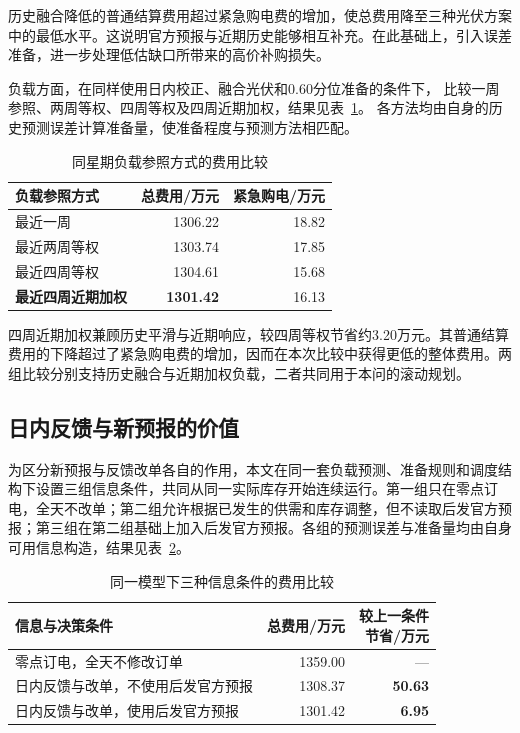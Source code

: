 历史融合降低的普通结算费用超过紧急购电费的增加，使总费用降至三种光伏方案中的最低水平。这说明官方预报与近期历史能够相互补充。在此基础上，引入误差准备，进一步处理低估缺口所带来的高价补购损失。

负载方面，在同样使用日内校正、融合光伏和0.60分位准备的条件下，
比较一周参照、两周等权、四周等权及四周近期加权，结果见表~\ref{tab:q3_load_compare}。
各方法均由自身的历史预测误差计算准备量，使准备程度与预测方法相匹配。

\begin{table}[!htbp]
\centering
\caption{同星期负载参照方式的费用比较}
\label{tab:q3_load_compare}
\begin{tabular}{lrr}
\toprule
负载参照方式 & 总费用/万元 & 紧急购电/万元\\
\midrule
最近一周 &1306.22&18.82\\
最近两周等权 &1303.74&17.85\\
最近四周等权 &1304.61&15.68\\
\textbf{最近四周近期加权} &\textbf{1301.42}&16.13\\
\bottomrule
\end{tabular}
\end{table}

四周近期加权兼顾历史平滑与近期响应，较四周等权节省约3.20万元。其普通结算费用的下降超过了紧急购电费的增加，因而在本次比较中获得更低的整体费用。两组比较分别支持历史融合与近期加权负载，二者共同用于本问的滚动规划。

\FloatBarrier
\subsection{日内反馈与新预报的价值}\label{sec:q3_information}

为区分新预报与反馈改单各自的作用，本文在同一套负载预测、准备规则和调度结构下设置三组信息条件，共同从同一实际库存开始连续运行。第一组只在零点订电，全天不改单；第二组允许根据已发生的供需和库存调整，但不读取后发官方预报；第三组在第二组基础上加入后发官方预报。各组的预测误差与准备量均由自身可用信息构造，结果见表~\ref{tab:q3_info}。

\begin{table}[H]
\centering
\caption{同一模型下三种信息条件的费用比较}
\label{tab:q3_info}
\begin{tabular}{p{}rr}
\toprule
信息与决策条件 & 总费用/万元 & \shortstack{较上一条件\\节省/万元}\\
\midrule
零点订电，全天不修改订单 &1359.00&---\\
日内反馈与改单，不使用后发官方预报 &1308.37&\textbf{50.63}\\
日内反馈与改单，使用后发官方预报 &1301.42&\textbf{6.95}\\
\bottomrule
\end{tabular}
\end{table}

